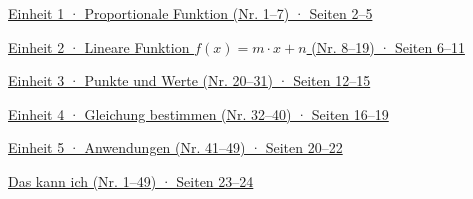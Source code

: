 \hypertarget{inhalt}{}
\medskip
\noindent\hyperlink{e1}{Einheit 1 · Proportionale Funktion (Nr. 1–7) · Seiten 2–5}\par\smallskip
\noindent\hyperlink{e2}{Einheit 2 · Lineare Funktion $f(x) = m \cdot x + n$ (Nr. 8–19) · Seiten 6–11}\par\smallskip
\noindent\hyperlink{e3}{Einheit 3 · Punkte und Werte (Nr. 20–31) · Seiten 12–15}\par\smallskip
\noindent\hyperlink{e4}{Einheit 4 · Gleichung bestimmen (Nr. 32–40) · Seiten 16–19}\par\smallskip
\noindent\hyperlink{e5}{Einheit 5 · Anwendungen (Nr. 41–49) · Seiten 20–22}\par\smallskip
\noindent\hyperlink{abhaken}{Das kann ich (Nr. 1–49) · Seiten 23–24}\par

